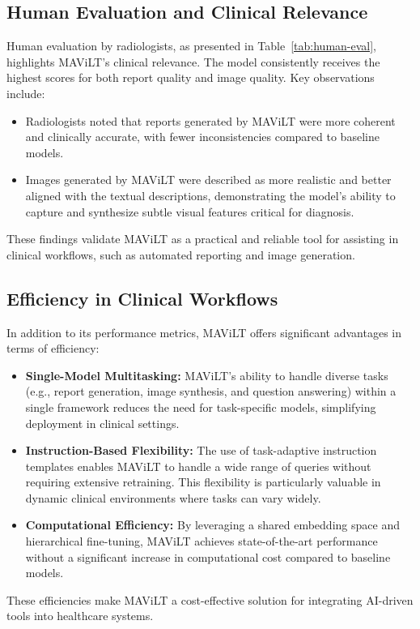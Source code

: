 \subsection{Human Evaluation and Clinical Relevance}

Human evaluation by radiologists, as presented in Table~\ref{tab:human-eval}, highlights MAViLT’s clinical relevance. The model consistently receives the highest scores for both report quality and image quality. Key observations include:
\begin{itemize}
    \item Radiologists noted that reports generated by MAViLT were more coherent and clinically accurate, with fewer inconsistencies compared to baseline models.
    \item Images generated by MAViLT were described as more realistic and better aligned with the textual descriptions, demonstrating the model’s ability to capture and synthesize subtle visual features critical for diagnosis.
\end{itemize}
These findings validate MAViLT as a practical and reliable tool for assisting in clinical workflows, such as automated reporting and image generation.

\subsection{Efficiency in Clinical Workflows}

In addition to its performance metrics, MAViLT offers significant advantages in terms of efficiency:
\begin{itemize}
    \item \textbf{Single-Model Multitasking:} MAViLT’s ability to handle diverse tasks (e.g., report generation, image synthesis, and question answering) within a single framework reduces the need for task-specific models, simplifying deployment in clinical settings.
    \item \textbf{Instruction-Based Flexibility:} The use of task-adaptive instruction templates enables MAViLT to handle a wide range of queries without requiring extensive retraining. This flexibility is particularly valuable in dynamic clinical environments where tasks can vary widely.
    \item \textbf{Computational Efficiency:} By leveraging a shared embedding space and hierarchical fine-tuning, MAViLT achieves state-of-the-art performance without a significant increase in computational cost compared to baseline models.
\end{itemize}
These efficiencies make MAViLT a cost-effective solution for integrating AI-driven tools into healthcare systems.



